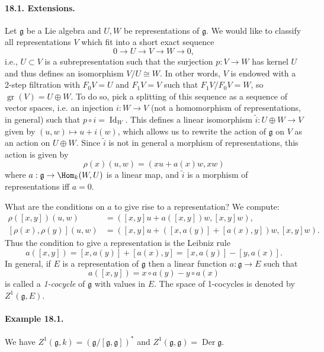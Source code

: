 \paragraph{18.1. Extensions.}
Let $\mathfrak g$ be a Lie algebra and $U,W$ be representations of $\mathfrak g$. We would like to classify all representations $V$ which fit into a short exact sequence
\[
0\longrightarrow U\longrightarrow V\longrightarrow W\longrightarrow0,\tag{18.1}
\]
i.e., $U\subset V$ is a subrepresentation such that the surjection $p:V\to W$ has kernel $U$ and thus defines an isomorphism $V/U\cong W$. In other words, $V$ is endowed with a 2-step filtration with $F_0V=U$ and $F_1V=V$ such that $F_1V/F_0V=W$, so $\operatorname{gr}(V)=U\oplus W$. To do so, pick a splitting of this sequence as a sequence of vector spaces, i.e. an injection $i:W\to V$ (not a homomorphism of representations, in general) such that $p\circ i=\operatorname{Id}_W$. This defines a linear isomorphism $\widetilde i:U\oplus W\to V$ given by $(u,w)\mapsto u+i(w)$, which allows us to rewrite the action of $\mathfrak g$ on $V$ as an action on $U\oplus W$. Since $\widetilde i$ is not in general a morphism of representations, this action is given by
\[
\rho(x)(u,w)=(xu+a(x)w,xw)
\]
where $a:\mathfrak g\to\Hom_k(W,U)$ is a linear map, and $\widetilde i$ is a morphism of representations iff $a=0$.

What are the conditions on $a$ to give rise to a representation? We compute:
\[
\begin{aligned}
\rho([x,y])(u,w)&=([x,y]u+a([x,y])w,[x,y]w),\\
[\rho(x),\rho(y)](u,w)&=([x,y]u+([x,a(y)]+[a(x),y])w,[x,y]w).
\end{aligned}
\]
Thus the condition to give a representation is the Leibniz rule
\[
a([x,y])=[x,a(y)]+[a(x),y]=[x,a(y)]-[y,a(x)].
\]
In general, if $E$ is a representation of $\mathfrak g$ then a linear function $a:\mathfrak g\to E$ such that
\[
a([x,y])=x\circ a(y)-y\circ a(x)
\]
is called a \emph{1-cocycle} of $\mathfrak g$ with values in $E$. The space of 1-cocycles is denoted by $Z^1(\mathfrak g,E)$.

\paragraph{Example 18.1.}
We have $Z^1(\mathfrak g,k)=(\mathfrak g/[\mathfrak g,\mathfrak g])^*$ and $Z^1(\mathfrak g,\mathfrak g)=\operatorname{Der}\mathfrak g$.

